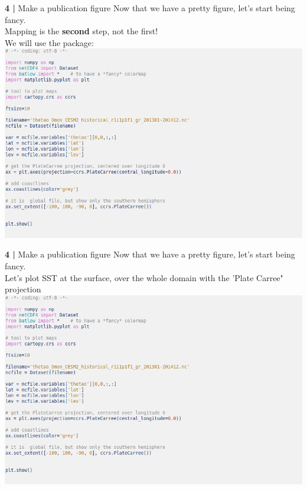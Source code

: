 
\begin{frame}{\textbf{4 |} Make a publication figure} 
    Now that we have a pretty figure, let's start being fancy.\\
        \vspace{0.3cm}
    Mapping is the \textbf{second} step, not the first!\\
        \vspace{0.5cm}
    We will use the \href{https://scitools.org.uk/cartopy/docs/latest/}{} package:\\
    \includegraphics[scale=0.35]{images/Script2_step1.png}
\end{frame}
 

\begin{frame}{\textbf{4 |} Make a publication figure} 
    Now that we have a pretty figure, let's start being fancy.\\
        \vspace{0.3cm}
    Let's plot SST at the surface, over the whole domain with the 'Plate Carree" projection
        \includegraphics[scale=0.35]{images/Script2_step1.png}
\end{frame}
  
